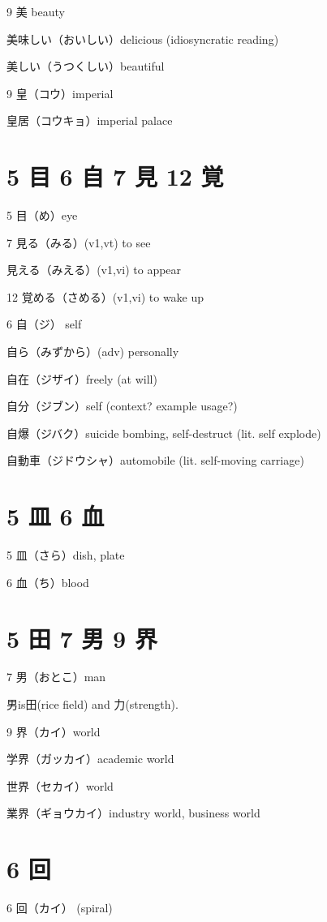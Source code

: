 9 美 beauty

美味しい（おいしい）delicious (idiosyncratic reading)

美しい（うつくしい）beautiful

9 皇（コウ）imperial

皇居（コウキョ）imperial palace

\section{5 目 6 自 7 見 12 覚}

5 目（め）eye

7 見る（みる）(v1,vt) to see

見える（みえる）(v1,vi) to appear

12 覚める（さめる）(v1,vi) to wake up

6 自（ジ） self

自ら（みずから）(adv) personally

自在（ジザイ）freely (at will)

自分（ジブン）self (context? example usage?)

自爆（ジバク）suicide bombing, self-destruct (lit. self explode)

自動車（ジドウシャ）automobile (lit. self-moving carriage)

\section{5 皿 6 血}

5 皿（さら）dish, plate

6 血（ち）blood

\section{5 田 7 男 9 界}

7 男（おとこ）man

男is田(rice field) and 力(strength).

9 界（カイ）world

学界（ガッカイ）academic world

世界（セカイ）world

業界（ギョウカイ）industry world, business world

\section{6 回}

6 回（カイ） (spiral)

